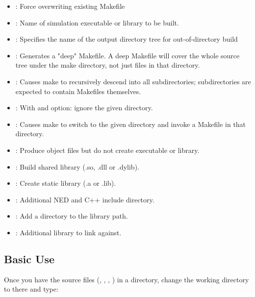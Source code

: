 \begin{itemize}
    \item{ : Force overwriting existing Makefile}
    \item{ : Name of simulation executable or library to be built.}
    \item{ : Specifies the name of the output directory tree
                          for out-of-directory build}
    \item{ : Generates a "deep" Makefile. A deep Makefile will
                          cover the whole source tree under the make directory,
                          not just files in that directory.}
    \item{ : Causes make to recursively descend into all subdirectories;
                          subdirectories are expected to contain Makefiles themselves.}
    \item{ :
                          With  and  option: ignore the given directory.}
    \item{ :
                          Causes make to switch to the given directory and invoke
                          a Makefile in that directory.}
    \item{ :  Produce object files but do not create executable or
                          library.}
    \item{ : Build shared library (.so, .dll or .dylib).}
    \item{ : Create static library (.a or .lib).}
    \item{ :         Additional NED and C++ include directory.}
    \item{ :         Add a directory to the library path.}
    \item{ :     Additional library to link against.}
\end{itemize}


\subsection{Basic Use}
\label{sec:build-sim-progs:makemake-basic-use}

Once you have the source files (, , ,
) in a directory, change the working directory to there and type:

